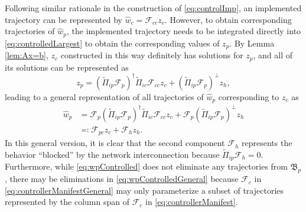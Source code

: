 \documentclass[11pt,print,draftcls,onecolumn,romanappendices]{ieeecolor}
\newcommand{\B}{\mathfrak{B}}
\newcommand{\F}{\mathcal{F}}
\begin{document}
{Following similar rationale in the construction of \eqref{eq:controlImp}, an implemented trajectory can be represented by $\hat{w}_c=\F_{cc}z_c$. However, to obtain corresponding trajectories of $\hat{w}_p$, the implemented trajectory needs to be integrated directly into \eqref{eq:controlledLargest} to obtain the corresponding values of $z_p$. By Lemma \ref{lem:Ax=b}, $z_c$ constructed in this way definitely has solutions for $z_p$, and all of its solutions can be represented as
\begin{equation}
    z_p=(\widetilde{\Pi}_{ip}\F_p)^\dagger\widetilde{\Pi}_{ic}\F_{cc}z_c+(\widetilde{\Pi}_{ip}\F_p)^\perp z_h,
\end{equation}
leading to a general representation of all trajectories of $\hat{w}_p$ corresponding to $z_c$ as
\begin{equation}\label{eq:wpControlledGeneral}
\begin{split}
    \hat{w}_p&=\F_p(\widetilde{\Pi}_{ip}\F_p)^\dagger\widetilde{\Pi}_{ic}\F_{cc}z_c+\F_p(\widetilde{\Pi}_{ip}\F_p)^\perp z_h\\
    &\eqqcolon \F_{pc}z_c+\F_hz_h.
\end{split}
\end{equation}
In this general version, it is clear that the second component $\F_h$ represents the behavior ``blocked'' by the network interconnection because $\widetilde{\Pi}_{ip}\F_h=0$. Furthermore, while \eqref{eq:wpControlled} does not eliminate any trajectories from $\B_p$, there may be eliminations in \eqref{eq:wpControlledGeneral} because $\F_c$ in \eqref{eq:controllerManifestGeneral} may only parameterize a subset of trajectories represented by the column span of $\F_c$ in \eqref{eq:controllerManifest}. 

}
\end{document}
